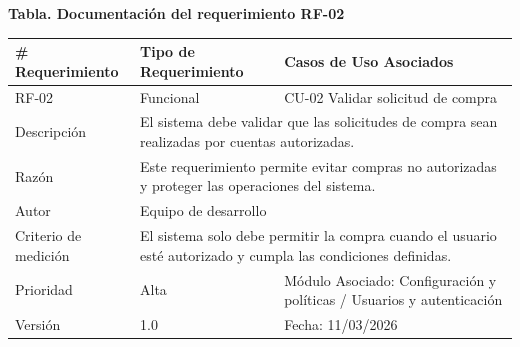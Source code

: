 \documentclass[12pt,letterpaper]{article}
\begin{document}
\vspace{0.2cm}

\noindent
\begin{minipage}{\textwidth}
\centering
\scriptsize
\renewcommand{\arraystretch}{0.9}
\setlength{\tabcolsep}{3pt}
\setlength{\arrayrulewidth}{0.5pt}

\textbf{Tabla. Documentación del requerimiento RF-02}

\vspace{2pt}

\begin{tabularx}{\textwidth}{|p{2.6cm}|X|p{3.4cm}|}
\hline
\# Requerimiento & Tipo de Requerimiento & Casos de Uso Asociados \\ \hline
RF-02 & Funcional & CU-02 Validar solicitud de compra \\ \hline
Descripción & \multicolumn{2}{X|}{El sistema debe validar que las solicitudes de compra sean realizadas por cuentas autorizadas.} \\ \hline
Razón & \multicolumn{2}{X|}{Este requerimiento permite evitar compras no autorizadas y proteger las operaciones del sistema.} \\ \hline
Autor & \multicolumn{2}{X|}{Equipo de desarrollo} \\ \hline
Criterio de medición & \multicolumn{2}{X|}{El sistema solo debe permitir la compra cuando el usuario esté autorizado y cumpla las condiciones definidas.} \\ \hline
Prioridad & Alta & Módulo Asociado: Configuración y políticas / Usuarios y autenticación \\ \hline
Versión & 1.0 & Fecha: 11/03/2026 \\ \hline
\end{tabularx}
\end{minipage}

\vspace{0.2cm}
\end{document}
